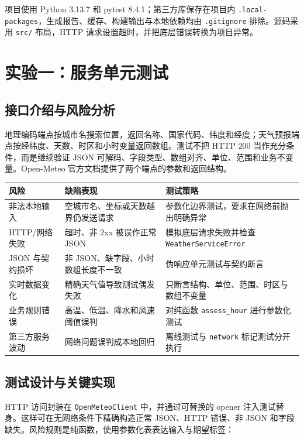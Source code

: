 \documentclass[UTF8,zihao=-4,a4paper]{ctexart}
\newcommand{\code}[1]{\texttt{#1}}
\begin{document}
项目使用 Python 3.13.7 和 pytest 8.4.1；第三方库保存在项目内 \code{.local-packages}，生成报告、缓存、构建输出与本地依赖均由 \code{.gitignore} 排除。源码采用 \code{src/} 布局，HTTP 请求设置超时，并把底层错误转换为项目异常。

\section{实验一：服务单元测试}

\subsection{接口介绍与风险分析}

地理编码端点按城市名搜索位置，返回名称、国家代码、纬度和经度；天气预报端点按经纬度、天数、时区和小时变量返回数组。测试不把 HTTP 200 当作充分条件，而是继续验证 JSON 可解码、字段类型、数组对齐、单位、范围和业务不变量。Open-Meteo 官方文档提供了两个端点的参数和返回结构\cite{openmeteo-geocoding,openmeteo-forecast}。

\begin{longtable}{p{}p{}p{}}
\toprule
风险 & 缺陷表现 & 测试策略 \\
\midrule
\endhead
非法本地输入 & 空城市名、坐标或天数越界仍发送请求 & 参数化边界测试，要求在网络前抛出明确异常 \\
HTTP/网络失败 & 超时、非 2xx 被误作正常 JSON & 模拟底层请求失败并检查 \code{WeatherServiceError} \\
JSON 与契约损坏 & 非 JSON、缺字段、小时数组长度不一致 & 伪响应单元测试与契约断言 \\
实时数据变化 & 精确天气值导致测试偶发失败 & 只断言结构、单位、范围、时区与数组不变量 \\
业务规则错误 & 高温、低温、降水和风速阈值误判 & 对纯函数 \code{assess\_hour} 进行参数化测试 \\
第三方服务波动 & 网络问题误判成本地回归 & 离线测试与 \code{network} 标记测试分开执行 \\
\bottomrule
\end{longtable}

\subsection{测试设计与关键实现}

HTTP 访问封装在 \code{OpenMeteoClient} 中，并通过可替换的 opener 注入测试替身。这样可在无网络条件下精确构造正常 JSON、HTTP 错误、非 JSON 和字段缺失。风险规则是纯函数，使用参数化表表达输入与期望标签：
\end{document}
